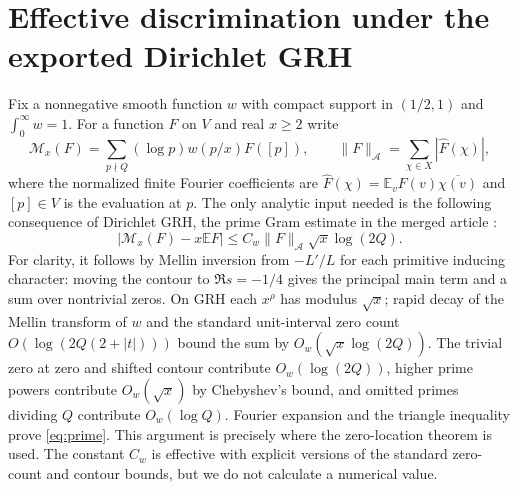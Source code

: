 \documentclass[11pt]{article}
\theoremstyle{remark}\newtheorem{remark}[theorem]{Remark}
\newcommand{\E}{\mathbb E}
\begin{document}
\section{Effective discrimination under the exported Dirichlet GRH}
\label{sec:effective}
Fix a nonnegative smooth function $w$ with compact support in $(1/2,1)$ and $\int_0^\infty w=1$. For a function $F$ on $V$ and real $x\ge2$ write
\[
 \mathcal M_x(F)=\sum_{p\nmid Q}(\log p)w(p/x)F([p]),\qquad
 \|F\|_{\mathcal A}=\sum_{\chi\in X}|\widehat F(\chi)|,
\]
where the normalized finite Fourier coefficients are $\widehat F(\chi)=\E_v F(v)\overline{\chi(v)}$ and $[p]\in V$ is the evaluation at $p$. The only analytic input needed is the following consequence of Dirichlet GRH, the prime Gram estimate in the merged article \cite[\texttt{rec:lem:gram}]{article}:
\begin{equation}\label{eq:prime}
 |\mathcal M_x(F)-x\E F|\le C_w\|F\|_{\mathcal A}\sqrt{x}\log(2Q).
\end{equation}
For clarity, it follows by Mellin inversion from $-L'/L$ for each primitive inducing character: moving the contour to $\Re s=-1/4$ gives the principal main term and a sum over nontrivial zeros. On GRH each $x^\rho$ has modulus $\sqrt{x}$; rapid decay of the Mellin transform of $w$ and the standard unit-interval zero count $O(\log(2Q(2+|t|)))$ bound the sum by $O_w(\sqrt{x}\log(2Q))$. The trivial zero at zero and shifted contour contribute $O_w(\log(2Q))$, higher prime powers contribute $O_w(\sqrt{x})$ by Chebyshev's bound, and omitted primes dividing $Q$ contribute $O_w(\log Q)$. Fourier expansion and the triangle inequality prove \eqref{eq:prime}. This argument is precisely where the zero-location theorem is used. The constant $C_w$ is effective with explicit versions of the standard zero-count and contour bounds, but we do not calculate a numerical value.
\end{document}
